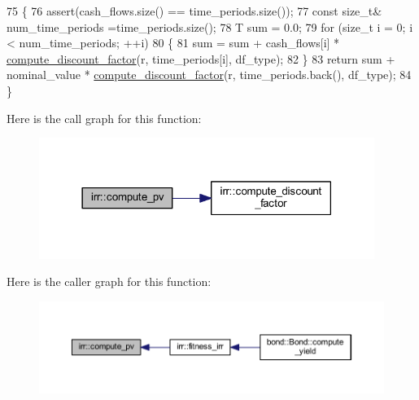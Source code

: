 \begin{DoxyCode}
75     \{
76         assert(cash\_flows.size() == time\_periods.size());
77         \textcolor{keyword}{const} \textcolor{keywordtype}{size\_t}& num\_time\_periods =time\_periods.size();
78         T sum = 0.0;
79         \textcolor{keywordflow}{for} (\textcolor{keywordtype}{size\_t} i = 0; i < num\_time\_periods; ++i)
80         \{
81             sum = sum + cash\_flows[i] * \hyperlink{namespaceirr_ae00c3409ca39fa2dc47ce61da4169a66}{compute\_discount\_factor}(r, time\_periods[i], 
      df\_type);
82         \}
83         \textcolor{keywordflow}{return} sum + nominal\_value * \hyperlink{namespaceirr_ae00c3409ca39fa2dc47ce61da4169a66}{compute\_discount\_factor}(r, time\_periods.back(),
       df\_type);
84     \}
\end{DoxyCode}
Here is the call graph for this function\+:
\nopagebreak
\begin{figure}[H]
\begin{center}
\leavevmode
\includegraphics[width=309pt]{namespaceirr_ac3411cd2ad174f399c525d8d17dcdad0_cgraph}
\end{center}
\end{figure}
Here is the caller graph for this function\+:
\nopagebreak
\begin{figure}[H]
\begin{center}
\leavevmode
\includegraphics[width=350pt]{namespaceirr_ac3411cd2ad174f399c525d8d17dcdad0_icgraph}
\end{center}
\end{figure}
\mbox{\label{namespaceirr_a6801aa96a307b3f52817dd1a3bcd065e}} 
